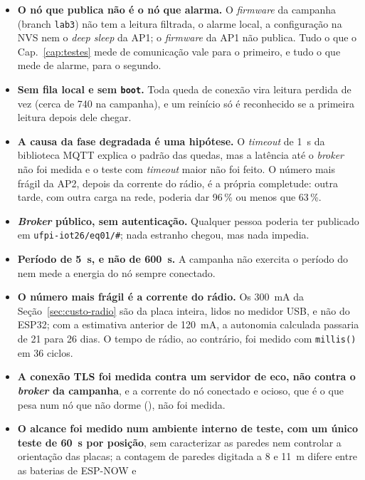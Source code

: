 \begin{itemize}
  \item \textbf{O nó que publica não é o nó que alarma.} O
    \emph{firmware} da campanha (branch \texttt{lab3}) não tem a leitura
    filtrada, o alarme local, a configuração na NVS nem o \emph{deep
    sleep} da AP1; o \emph{firmware} da AP1 não publica. Tudo o que o
    Cap.~\ref{cap:testes} mede de comunicação vale para o primeiro, e
    tudo o que mede de alarme, para o segundo.
  \item \textbf{Sem fila local e sem \texttt{boot}.} Toda queda de
    conexão vira leitura perdida de vez (cerca de 740 na campanha), e um
    reinício só é reconhecido se a primeira leitura depois dele chegar.
  \item \textbf{A causa da fase degradada é uma hipótese.} O
    \emph{timeout} de \SI{1}{\second} da biblioteca MQTT explica o padrão
    das quedas, mas a latência até o \emph{broker} não foi medida e o
    teste com \emph{timeout} maior não foi feito. O número mais frágil
    da AP2, depois da corrente do rádio, é a própria completude: outra
    tarde, com outra carga na rede, poderia dar 96\,\% ou menos que
    63\,\%.
  \item \textbf{\emph{Broker} público, sem autenticação.} Qualquer
    pessoa poderia ter publicado em \texttt{ufpi-iot26/eq01/\#}; nada
    estranho chegou, mas nada impedia.
  \item \textbf{Período de \SI{5}{\second}, e não de \SI{600}{\second}.}
    A campanha não exercita o período do  nem mede a energia do
    nó sempre conectado.
  \item \textbf{O número mais frágil é a corrente do rádio.} Os
    \SI{300}{\milli\ampere} da Seção~\ref{sec:custo-radio} são da placa
    inteira, lidos no medidor USB, e não do ESP32; com a estimativa
    anterior de \SI{120}{\milli\ampere}, a autonomia calculada passaria de
    21 para 26 dias. O tempo de rádio, ao contrário, foi medido com
    \texttt{millis()} em 36 ciclos.
  \item \textbf{A conexão TLS foi medida contra um servidor de eco, não
    contra o \emph{broker} da campanha}, e a corrente do nó conectado e
    ocioso, que é o que pesa num nó que não dorme (), não foi
    medida.
  \item \textbf{O alcance foi medido num ambiente interno de teste, com
    um único teste de \SI{60}{\second} por posição}, sem caracterizar as
    paredes nem controlar a orientação das placas; a contagem de paredes
    digitada a 8 e \SI{11}{\metre} difere entre as baterias de ESP-NOW e

\end{itemize}

